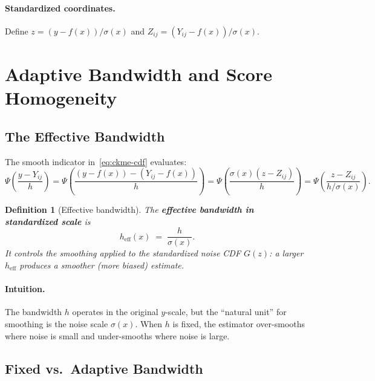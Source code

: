 \documentclass[11pt]{article}
\newtheorem{definition}[theorem]{Definition}
\theoremstyle{remark}
\begin{document}
\paragraph{Standardized coordinates.}
Define $z = (y - f(x))/\sigma(x)$ and
$Z_{ij} = (Y_{ij} - f(x))/\sigma(x)$.


\section{Adaptive Bandwidth and Score Homogeneity}
\label{sec:mechanism}

\subsection{The Effective Bandwidth}
\label{sec:h-eff}

The smooth indicator in~\eqref{eq:ckme-cdf} evaluates:
\[
  \Psi\!\left(\frac{y - Y_{ij}}{h}\right)
  = \Psi\!\left(\frac{(y - f(x)) - (Y_{ij} - f(x))}{h}\right)
  = \Psi\!\left(\frac{\sigma(x)(z - Z_{ij})}{h}\right)
  = \Psi\!\left(\frac{z - Z_{ij}}{h/\sigma(x)}\right).
\]

\begin{definition}[Effective bandwidth]
\label{def:h-eff}
The \textbf{effective bandwidth in standardized scale} is
\begin{equation}
\label{eq:h-eff}
  h_{\mathrm{eff}}(x) \;=\; \frac{h}{\sigma(x)}.
\end{equation}
It controls the smoothing applied to the standardized noise CDF
$G(z)$: a larger $h_{\mathrm{eff}}$ produces a smoother (more biased)
estimate.
\end{definition}

\paragraph{Intuition.}
The bandwidth $h$ operates in the original $y$-scale, but the ``natural
unit'' for smoothing is the noise scale $\sigma(x)$. When $h$ is
fixed, the estimator over-smooths where noise is small and
under-smooths where noise is large.

\subsection{Fixed vs.\ Adaptive Bandwidth}
\label{sec:fixed-vs-adaptive}
\end{document}
